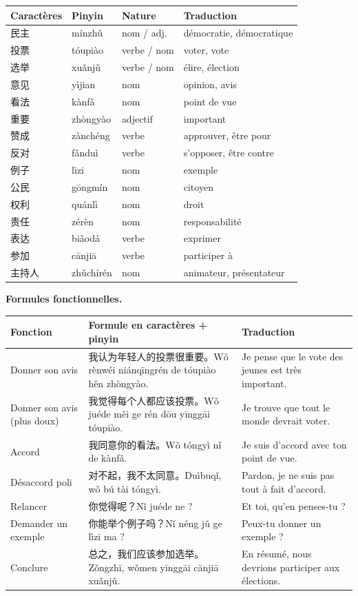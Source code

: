 \documentclass[11pt]{article}
\begin{document}
\begin{center}
\begin{tabularx}{\linewidth}{|X|X|X|X|}
\hline
\rowcolor{popblueL} Caractères & Pinyin & Nature & Traduction \\
\hline
民主 & mínzhǔ & nom / adj. & démocratie, démocratique \\
\hline
投票 & tóupiào & verbe / nom & voter, vote \\
\hline
选举 & xuǎnjǔ & verbe / nom & élire, élection \\
\hline
意见 & yìjian & nom & opinion, avis \\
\hline
看法 & kànfǎ & nom & point de vue \\
\hline
重要 & zhòngyào & adjectif & important \\
\hline
赞成 & zànchéng & verbe & approuver, être pour \\
\hline
反对 & fǎnduì & verbe & s'opposer, être contre \\
\hline
例子 & lìzi & nom & exemple \\
\hline
公民 & gōngmín & nom & citoyen \\
\hline
权利 & quánlì & nom & droit \\
\hline
责任 & zérèn & nom & responsabilité \\
\hline
表达 & biǎodá & verbe & exprimer \\
\hline
参加 & cānjiā & verbe & participer à \\
\hline
主持人 & zhǔchírén & nom & animateur, présentateur \\
\hline
\end{tabularx}
\end{center}

\textbf{Formules fonctionnelles.}

\begin{center}
\begin{tabularx}{\linewidth}{|X|X|X|}
\hline
\rowcolor{popblueL} Fonction & Formule en caractères + pinyin & Traduction \\
\hline
Donner son avis & 我认为年轻人的投票很重要。Wǒ rènwéi niánqīngrén de tóupiào hěn zhòngyào. & Je pense que le vote des jeunes est très important. \\
\hline
Donner son avis (plus doux) & 我觉得每个人都应该投票。Wǒ juéde měi ge rén dōu yīnggāi tóupiào. & Je trouve que tout le monde devrait voter. \\
\hline
Accord & 我同意你的看法。Wǒ tóngyì nǐ de kànfǎ. & Je suis d'accord avec ton point de vue. \\
\hline
Désaccord poli & 对不起，我不太同意。Duìbuqǐ, wǒ bú tài tóngyì. & Pardon, je ne suis pas tout à fait d'accord. \\
\hline
Relancer & 你觉得呢？Nǐ juéde ne ? & Et toi, qu'en penses-tu ? \\
\hline
Demander un exemple & 你能举个例子吗？Nǐ néng jǔ ge lìzi ma ? & Peux-tu donner un exemple ? \\
\hline
Conclure & 总之，我们应该参加选举。Zǒngzhī, wǒmen yīnggāi cānjiā xuǎnjǔ. & En résumé, nous devrions participer aux élections. \\
\hline
\end{tabularx}
\end{center}
\end{document}
